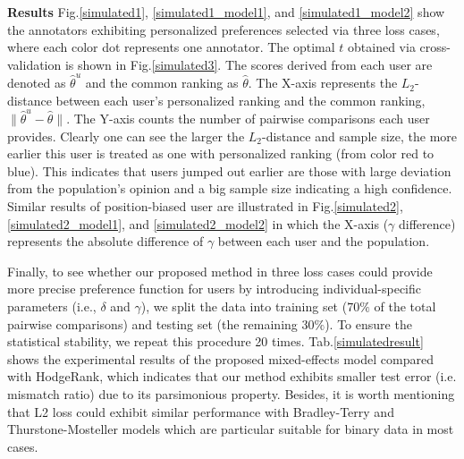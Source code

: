 \documentclass[10pt,journal,cspaper,compsoc]{IEEEtran}
\begin{document}
{\textbf{Results} Fig.\ref{simulated1}, \ref{simulated1_model1}, and \ref{simulated1_model2} show the annotators exhibiting personalized preferences selected via three loss cases, where each color dot represents one annotator. The optimal $t$ obtained via cross-validation is shown in Fig.\ref{simulated3}. The scores derived from each user are denoted as $\hat{\theta}^u$ and the common ranking as $\hat{\theta}$. The X-axis represents the $L_2$-distance between each user's personalized ranking and the common ranking, $\|\hat{\theta}^u-\hat{\theta}\|$. The Y-axis counts the number of pairwise comparisons each user provides.
Clearly one can see the larger the $L_2$-distance and sample size, the more earlier this user is treated as one with personalized ranking (from color red to blue). This indicates that users jumped out earlier are those with large deviation from the population's opinion and a big sample size indicating a high confidence. Similar results of position-biased user are illustrated in Fig.\ref{simulated2}, \ref{simulated2_model1}, and \ref{simulated2_model2} in which the X-axis ($\gamma$ difference) represents the absolute difference of $\gamma$ between each user and the population.


Finally, to see whether our proposed method in three loss cases could provide more precise preference function for users by introducing individual-specific parameters (i.e., $\delta$ and $\gamma$), we split the data into training set ($70\%$ of the total pairwise comparisons) and testing set (the remaining $30\%$). To ensure the statistical
stability, we repeat this procedure 20 times. Tab.\ref{simulatedresult} shows the experimental results of the proposed mixed-effects model compared with HodgeRank, which indicates that our method exhibits smaller test error (i.e. mismatch ratio) due to its
parsimonious property. Besides, it is worth mentioning that L2 loss could exhibit similar performance with Bradley-Terry and Thurstone-Mosteller models which are particular suitable for binary data in most cases.





}
\end{document}
